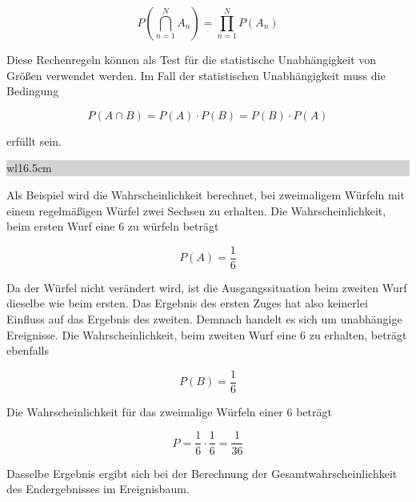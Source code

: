 \begin{equation}\label{eq:twosixtysix}
P\left(\bigcap _{n=1}^{N}A_{n}  \right)=\prod _{n=1}^{N}P\left(A_{n} \right)
\end{equation}

\noindent Diese Rechenregeln k\"{o}nnen als Test f\"{u}r die statistische Unabh\"{a}ngigkeit von Gr\"{o}{\ss}en verwendet werden. Im Fall der statistischen Unabh\"{a}ngigkeit muss die Bedingung

\begin{equation}\label{eq:twosixtyseven}
P(A\cap B)=P(A)\cdot P(B)=P(B)\cdot P(A)
\end{equation}

\noindent erf\"{u}llt sein.\bigskip

\noindent
\colorbox{lightgray}{%
%
\renewcommand\arraystretch{0.6}%
\begin{tabular}{ wl{16.5cm} }
{\selectfont
{}}
\end{tabular}%
}\bigskip

\noindent Als Beispiel wird die Wahrscheinlichkeit berechnet, bei zweimaligem W\"{u}rfeln mit einem regelm\"{a}{\ss}igen W\"{u}rfel zwei Sechsen zu erhalten. Die Wahrscheinlichkeit, beim ersten Wurf eine 6 zu w\"{u}rfeln betr\"{a}gt 

\begin{equation}\label{eq:twosixtyeight}
P(A)=\dfrac{1}{6}
\end{equation}

\noindent Da der W\"{u}rfel nicht ver\"{a}ndert wird, ist die Ausgangssituation beim zweiten Wurf dieselbe wie beim ersten. Das Ergebnis des ersten Zuges hat also keinerlei Einfluss auf das Ergebnis des zweiten. Demnach handelt es sich um unabh\"{a}ngige Ereignisse. Die Wahrscheinlichkeit, beim zweiten Wurf eine 6 zu erhalten, betr\"{a}gt ebenfalls 

\begin{equation}\label{eq:twosixtynine}
P(B)=\dfrac{1}{6}
\end{equation}

\noindent Die Wahrscheinlichkeit f\"{u}r das zweimalige W\"{u}rfeln einer 6 betr\"{a}gt

\begin{equation}\label{eq:twoseventy}
P=\dfrac{1}{6} \cdot \dfrac{1}{6} =\dfrac{1}{36}
\end{equation}

\noindent Dasselbe Ergebnis ergibt sich bei der Berechnung der Gesamtwahrscheinlichkeit des Endergebnisses im Ereignisbaum.\bigskip

